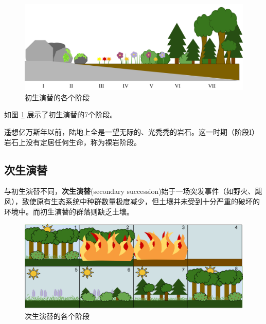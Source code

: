 \begin{figure}[htbp]
    \centering
    \includegraphics[width=400pt]{images/primary-succession.png}
    \caption{初生演替的各个阶段}
    \label{fig:primary-succession}
\end{figure}

如图 \ref{fig:primary-succession} 展示了初生演替的7个阶段。

遥想亿万斯年以前，陆地上全是一望无际的、光秃秃的岩石。这一时期（阶段I）岩石上没有定居任何生命，称为裸岩阶段。

\subsection{次生演替}
与初生演替不同，\textbf{次生演替}(secondary succession)始于一场突发事件（如野火、飓风），致使原有生态系统中种群数量极度减少，但土壤并未受到十分严重的破坏的环境中。而初生演替的群落则缺乏土壤。

\begin{figure}[htbp]
    \centering
    \includegraphics[width=400pt]{images/secondary-succession.png}
    \caption{次生演替的各个阶段}
    \label{fig:secondary-succession}
\end{figure}
